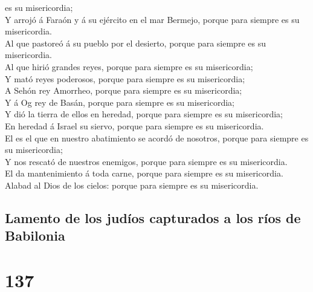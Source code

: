 es su misericordia;\\
 Y arrojó á Faraón y á su ejército en el mar Bermejo,
porque para siempre es su misericordia.\\
 Al que pastoreó á su pueblo por el desierto, porque para
siempre es su misericordia.\\
 Al que hirió grandes reyes, porque para siempre es su
misericordia;\\
 Y mató reyes poderosos, porque para siempre es su
misericordia;\\
 A Sehón rey Amorrheo, porque para siempre es su
misericordia;\\
 Y á Og rey de Basán, porque para siempre es su
misericordia;\\
 Y dió la tierra de ellos en heredad, porque para siempre
es su misericordia;\\
 En heredad á Israel su siervo, porque para siempre es su
misericordia.\\
 El es el que en nuestro abatimiento se acordó de nosotros,
porque para siempre es su misericordia;\\
 Y nos rescató de nuestros enemigos, porque para siempre es
su misericordia.\\
 El da mantenimiento á toda carne, porque para siempre es
su misericordia.\\
 Alabad al Dios de los cielos: porque para siempre es su
misericordia.

\hypertarget{lamento-de-los-juduxedos-capturados-a-los-ruxedos-de-babilonia}{%
\subsection{Lamento de los judíos capturados a los ríos de
Babilonia}\label{lamento-de-los-juduxedos-capturados-a-los-ruxedos-de-babilonia}}

\hypertarget{section-136}{%
\section{137}\label{section-136}}

